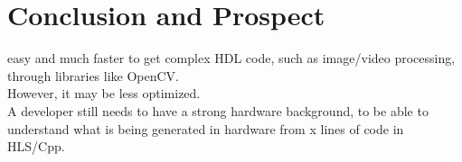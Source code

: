 \chapter{Conclusion and Prospect}
\label{cha:ConclusionAndProspect}


%
%
%
%


easy and much faster to get complex HDL code, such as image/video processing, through libraries like OpenCV.\\
However, it may be less optimized.\\
A developer still needs to have a strong hardware background, to be able to understand what is being generated in hardware from x lines of code in HLS/Cpp.

